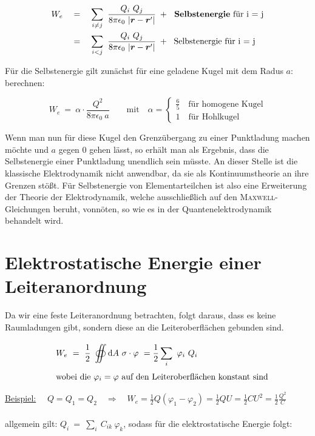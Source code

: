 \begin{align*}
W_e \quad &= \quad \sum_{i\neq j} \ \frac{Q_i \ Q_j}{8\pi\epsilon_0 \ |\vec{r}-\vec{r}'|} \; + \; \text{\textbf{ Selbstenergie} für i = j}\\
&= \quad \sum_{i<j} \ \frac{Q_i \ Q_j}{8\pi\epsilon_0 \ |\vec{r}-\vec{r}'|} \; + \; \text{ Selbstenergie für i = j}\\
\end{align*}

Für die Selbstenergie gilt zunächst für eine geladene Kugel mit dem Radus $a$: berechnen:

\begin{equation*}
W_e \ = \ \alpha \cdot \frac{Q^2}{8\pi\epsilon_0 \ a} \qquad \text{mit} \quad \alpha = \begin{cases}
	\frac{6}{5} \quad \text{für homogene Kugel}\\
	1 \quad \text{für Hohlkugel}
  \end{cases}	
\end{equation*}	

Wenn man nun für diese Kugel den Grenzübergang zu einer Punktladung machen möchte und $a$ gegen 0 gehen lässt, so erhält man als Ergebnis, dass die Selbstenergie einer Punktladung unendlich sein müsste. An dieser Stelle ist die klassische Elektrodynamik nicht anwendbar, da sie als Kontinuumstheorie an ihre Grenzen stößt. Für Selbstenergie von Elementarteilchen ist also eine Erweiterung der Theorie der Elektrodynamik, welche ausschließlich auf den \textsc{Maxwell}-Gleichungen beruht, vonnöten, so wie es in der Quantenelektrodynamik behandelt wird.

\section{Elektrostatische Energie einer Leiteranordnung}

Da wir eine feste Leiteranordnung betrachten, folgt daraus, dass es keine Raumladungen gibt, sondern diese an die Leiteroberflächen gebunden sind.

\begin{align*}
& \quad W_e \ = \ \frac{1}{2} \ \oiint\limits_{{}}^{{}}\mathrm{d}{A}\  \sigma\cdot\varphi \  =  \frac{1}{2} \sum_i \ \varphi_i \ Q_i\\
&\quad \text{wobei die }\varphi_i = \varphi \text{ auf den Leiteroberflächen konstant sind}
\end{align*}

\underline{Beispiel:} $\quad Q=Q_1=Q_2 \quad\Rightarrow\quad  W_e =\frac{1}{2}Q(\varphi_1-\varphi_2 ) = \frac{1}{2}QU = \frac{1}{2}CU^2 = \frac{1}{2}\frac{Q^2}{C}$\\
\ \\
allgemein gilt: $Q_i \ = \ \sum_i \ C_{ik} \ \varphi_k$, sodass für die elektrostatische Energie folgt:

